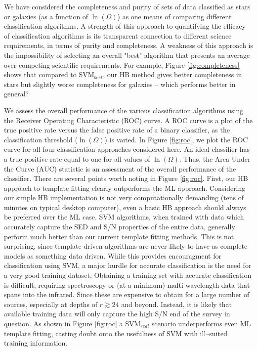 \documentclass[12pt,preprint]{aastex}
\begin{document}
We have considered the completeness and purity of
sets of data classified as stars or galaxies (as a function of $\ln(\Omega)$) as one means of comparing different classification algorithms.  A strength of this approach to quantifying the efficacy of classification algorithms is its transparent connection to different science requirements, in terms of purity and completeness.  A weakness of this approach is the impossibility of selecting an overall "best" algorithm that presents an average over competing scientific requirements.
For example, Figure \ref{fig:completeness} shows that compared to
SVM$_{best}$, our HB method gives better completeness in stars but
slightly worse completeness for galaxies -- which performs better in
general?

We assess the overall performance of the various classification
algorithms using the Receiver Operating Characteristic (ROC) curve.  A
ROC curve is a plot of the true positive rate versus the false
positive rate of a binary classifier, as the classification threshold
($\ln(\Omega)$) is varied.  In Figure \ref{fig:roc}, we plot the ROC
curve for all four classification approaches considered here.  An
ideal classifier has a true positive rate equal to one for all values
of $\ln(\Omega)$.  Thus, the Area Under the Curve (AUC) statistic is
an assessment of the overall performance of the classifier.  There are
several points worth noting in Figure \ref{fig:roc}.  First, our HB
approach to template fitting clearly outperforms the ML approach.
Considering our simple HB implementation is not very computationally
demanding (tens of minutes on typical desktop computer), even a basic
HB approach should always be preferred over the ML case.  SVM
algorithms, when trained with data which accurately capture the SED
and S/N properties of the entire data, generally perform much better
than our current template fitting methods.  This is not surprising,
since template driven algorithms are never likely to have as complete
models as something data driven.  While this provides encouragment for
classification using SVM, a major hurdle for accurate classification
is the need for a very good training dataset.  Obtaining a training
set with accurate classification is difficult, requiring spectroscopy
or (at a minimum) multi-wavelength data that spans into the infrared.
Since these are expensive to obtain for a large number of sources,
especially at depths of $r\gtrsim24$ and beyond.  Instead, it is
likely that available training data will only capture the high S/N end
of the survey in question.  As shown in Figure \ref{fig:roc} a
SVM$_{real}$ scenario underperforms even ML template fitting,
casting doubt onto the usefulness of SVM with ill--suited training
information.
\end{document}
